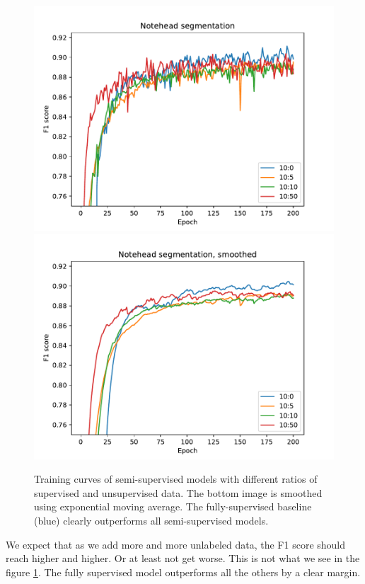 \begin{figure}[p]
    \centering
    \includegraphics[width=140mm]{../../figures/01-exploration-noteheads/noteheads-dropout.pdf}
    \includegraphics[width=140mm]{../../figures/01-exploration-noteheads/noteheads-dropout-smooth.pdf}
    \caption{Training curves of semi-supervised models with different ratios of supervised and unsupervised data. The bottom image is smoothed using exponential moving average. The fully-supervised baseline (blue) clearly outperforms all semi-supervised models.}
    \label{fig:ExplorationNoteheads}
\end{figure}

We expect that as we add more and more unlabeled data, the F1 score should reach higher and higher. Or at least not get worse. This is not what we see in the figure \ref{fig:ExplorationNoteheads}. The fully supervised model outperforms all the others by a clear margin.

